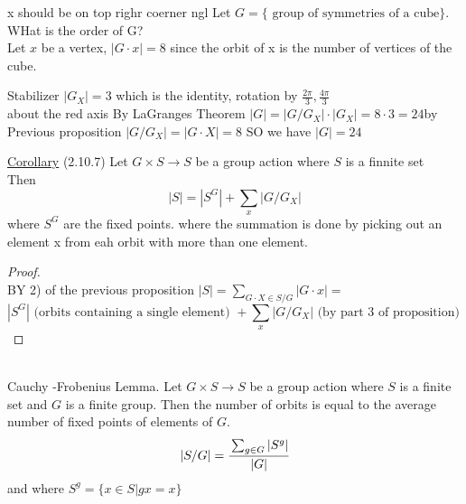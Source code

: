 \documentclass{article}
\begin{document}
\begin{example}
    
 x should be on top righr coerner ngl 
    Let $G = \{\text{ group of symmetries of a cube}\}$. WHat is the order of G? \\ Let $x$ be a vertex, $|G\cdot x|= 8$ since the orbit of x is the number of vertices of the cube. 
    
     Stabilizer $|G_X| = 3$ which is the identity, rotation by $\frac{2\pi}{3}, \frac{4\pi}{3}$ \\about the red axis
     By LaGranges Theorem $|G| = |G / G_X| \cdot |G_X| = 8 \cdot 3 = 24$by Previous proposition $|G / G_X |  = |G \cdot X| = 8$ SO we have $|G| = 24$
\end{example}
\underline{Corollary} (2.10.7) Let $G \times S \to S$ be a group action where $S$ is a finnite set \\ Then 
$$|S| = |S^G| + \sum_{x} |G / G_X | $$ where $S^G$ are the fixed points. where the summation is done by picking out an element x from eah orbit with more than one element.
\begin{proof}
    \leavevmode \\
    BY 2) of the previous proposition $|S| = \sum_{G\cdot X \in S/ G} |G \cdot x| = $ \[
| S^G | \text{ (orbits containing a single element) } + \sum_{x} | G / G_X | \text{ (by part 3 of proposition) }
\]


\end{proof}

\begin{lemma} \leavevmode \\ 
    Cauchy -Frobenius Lemma. 
    Let $G \times S \to S$ be a group action where $S$ is a finite set and $G$ is a finite group. Then the number of orbits is equal to the average number of fixed points of elements of $G$.
    $$|S / G| = \cfrac{\sum_{g\in G} |S^g|}{|G|}  $$
    and where $S^g = \{x\in S | gx = x\}$
\end{lemma}
\end{document}
